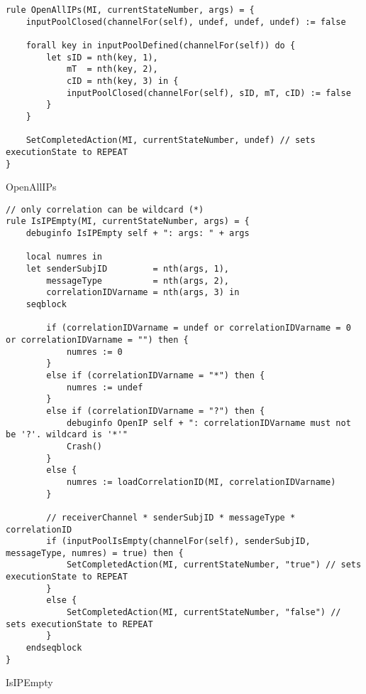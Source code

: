 \begin{listing}[H]
\begin{verbatim}
rule OpenAllIPs(MI, currentStateNumber, args) = {
    inputPoolClosed(channelFor(self), undef, undef, undef) := false

    forall key in inputPoolDefined(channelFor(self)) do {
        let sID = nth(key, 1),
            mT  = nth(key, 2),
            cID = nth(key, 3) in {
            inputPoolClosed(channelFor(self), sID, mT, cID) := false
        }
    }

    SetCompletedAction(MI, currentStateNumber, undef) // sets executionState to REPEAT
}
\end{verbatim}
\caption{OpenAllIPs}
\label{lst:asm:OpenAllIPs}
\end{listing}




\begin{listing}[H]
\begin{verbatim}
// only correlation can be wildcard (*)
rule IsIPEmpty(MI, currentStateNumber, args) = {
    debuginfo IsIPEmpty self + ": args: " + args

    local numres in
    let senderSubjID         = nth(args, 1),
        messageType          = nth(args, 2),
        correlationIDVarname = nth(args, 3) in
    seqblock

        if (correlationIDVarname = undef or correlationIDVarname = 0 or correlationIDVarname = "") then {
            numres := 0
        }
        else if (correlationIDVarname = "*") then {
            numres := undef
        }
        else if (correlationIDVarname = "?") then {
            debuginfo OpenIP self + ": correlationIDVarname must not be '?'. wildcard is '*'"
            Crash()
        }
        else {
            numres := loadCorrelationID(MI, correlationIDVarname)
        }

        // receiverChannel * senderSubjID * messageType * correlationID
        if (inputPoolIsEmpty(channelFor(self), senderSubjID, messageType, numres) = true) then {
            SetCompletedAction(MI, currentStateNumber, "true") // sets executionState to REPEAT
        }
        else {
            SetCompletedAction(MI, currentStateNumber, "false") // sets executionState to REPEAT
        }
    endseqblock
}
\end{verbatim}
\caption{IsIPEmpty}
\label{lst:asm:IsIPEmpty}
\end{listing}




